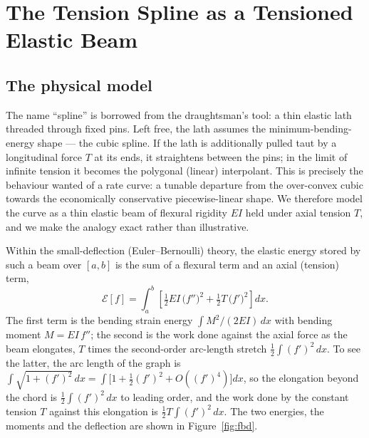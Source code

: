 \documentclass[]{interact}
\theoremstyle{plain}
\begin{document}
\section{The Tension Spline as a Tensioned Elastic Beam}\label{sec:tension}
\subsection{The physical model}
The name ``spline'' is borrowed from the draughtsman's tool: a thin elastic lath threaded
through fixed pins. Left free, the lath assumes the minimum-bending-energy shape --- the cubic
spline. If the lath is additionally pulled taut by a longitudinal force $T$ at its ends, it
straightens between the pins; in the limit of infinite tension it becomes the polygonal
(linear) interpolant. This is precisely the behaviour wanted of a rate curve: a tunable
departure from the over-convex cubic towards the economically conservative piecewise-linear
shape. We therefore model the curve as a thin elastic beam of flexural rigidity $EI$ held under
axial tension $T$, and we make the analogy exact rather than illustrative.

Within the small-deflection (Euler--Bernoulli) theory, the elastic energy stored by such a beam
over $[a,b]$ is the sum of a flexural term and an axial (tension) term,
\begin{equation}
\mathcal{E}[f]=\int_a^b\!\left[\tfrac12 EI\,\big(f''\big)^2+\tfrac12 T\,\big(f'\big)^2\right]dx .
\label{eq:functional}
\end{equation}
The first term is the bending strain energy $\int M^2/(2EI)\,dx$ with bending moment
$M=EI\,f''$; the second is the work done against the axial force as the beam elongates,
$T$ times the second-order arc-length stretch $\tfrac12\int (f')^2\,dx$. To see the latter,
the arc length of the graph is $\int\sqrt{1+(f')^2}\,dx=\int\big[1+\tfrac12(f')^2+O((f')^4)\big]dx$,
so the elongation beyond the chord is $\tfrac12\int(f')^2\,dx$ to leading order, and the work
done by the constant tension $T$ against this elongation is $\tfrac12 T\int(f')^2\,dx$. The two
energies, the moments and the deflection are shown in Figure~\ref{fig:fbd}.
\end{document}
